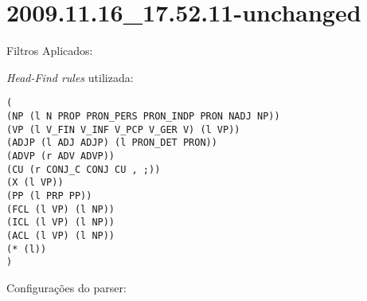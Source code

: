 \section{2009.11.16_17.52.11-unchanged} %
\label{sec:exp:2009.11.16_17.52.11-unchanged}

Filtros Aplicados:

\begin{itemize}
  
\end{itemize}

\emph{Head-Find rules} utilizada:

\scriptsize
\begin{verbatim}
(
(NP (l N PROP PRON_PERS PRON_INDP PRON NADJ NP))
(VP (l V_FIN V_INF V_PCP V_GER V) (l VP))
(ADJP (l ADJ ADJP) (l PRON_DET PRON))
(ADVP (r ADV ADVP))
(CU (r CONJ_C CONJ CU , ;))
(X (l VP))
(PP (l PRP PP))
(FCL (l VP) (l NP))
(ICL (l VP) (l NP))
(ACL (l VP) (l NP))
(* (l))
)

\end{verbatim}

\normalsize

Configurações do parser:

